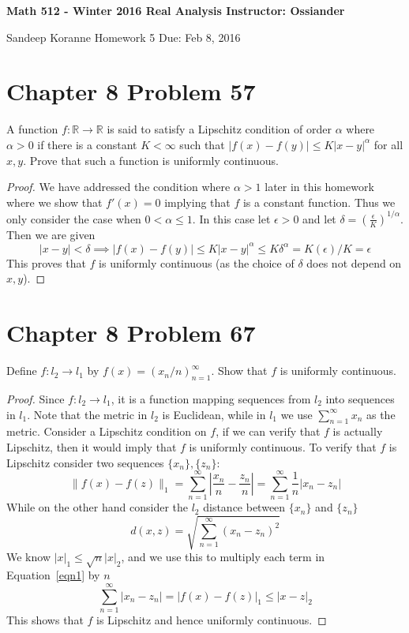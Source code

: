\documentclass{article}
\newtheorem{proof}{Proof}
\def\le{\leqslant}
\def\to{\rightarrow}
\def\RR{\mathbb R}
\begin{document}
\thispagestyle{empty}

\textbf{Math 512 - Winter 2016 \hfill Real Analysis  \hfill Instructor: Ossiander}

\hrulefill 
\medskip 

 {Sandeep Koranne \hfill Homework 5 \hfill Due: Feb 8, 2016}
\medskip


\section{Chapter 8 Problem 57}
A function $f:\RR \to \RR$ is said to satisfy a Lipschitz
condition of order $\alpha$ where $\alpha > 0$ if there is a
constant $K < \infty$ such that $|f(x)-f(y)|\le K|x-y|^\alpha$
for all $x,y$. Prove that such a function is uniformly continuous.
\begin{proof}
We have addressed the condition where $\alpha>1$ later in this homework
where we show that $f'(x)=0$ implying that $f$ is a constant function.
Thus we only consider the case when $0<\alpha\le 1$. In this case
let $\epsilon>0$ and let $\delta=(\frac{\epsilon}{K})^{1/\alpha}$. Then
we are given
\[
|x-y|< \delta \implies |f(x)-f(y)|\le K|x-y|^\alpha \le K\delta^\alpha = K(\epsilon)/K = \epsilon
\]
This proves that $f$ is uniformly continuous (as the choice of $\delta$
does not depend on $x,y$).
\end{proof}

\section{Chapter 8 Problem 67} Define $f:l_2\to l_1$ by $f(x)=(x_n/n)_{n=1}^\infty$.
Show that $f$ is uniformly continuous.
\begin{proof}
Since $f:l_2\to l_1$, it is a function mapping sequences from $l_2$ into
sequences in $l_1$. Note that the metric in $l_2$ is Euclidean, while
in $l_1$ we use $\sum_{n=1}^\infty x_n$ as the metric. Consider a Lipschitz
condition on $f$, if we can verify that $f$ is actually Lipschitz, then
it would imply that $f$ is uniformly continuous. To verify that $f$
is Lipschitz consider two sequences $\{x_n\},\{z_n\}$:
\begin{equation}
\|f(x)-f(z)\|_1 = \sum_{n=1}^\infty |\frac{x_n}{n} - \frac{z_n}{n}| =
\sum_{n=1}^\infty \frac{1}{n}|x_n - z_n| \label{eqn1}
\end{equation}
While on the other hand consider the $l_2$ distance between $\{x_n\}$
and $\{z_n\}$
\[
d(x,z) = \sqrt{\sum_{n=1}^\infty (x_n - z_n)^2}
\]
We know $|x|_1 \le \sqrt{n}|x|_2$, and we use this to multiply
each term in Equation~\ref{eqn1} by $n$
\[
\sum_{n=1}^\infty |x_n - z_n| = |f(x)-f(z)|_1 \le |x-z|_2
\]
This shows that $f$ is Lipschitz and hence uniformly continuous.
\end{proof}
\end{document}
